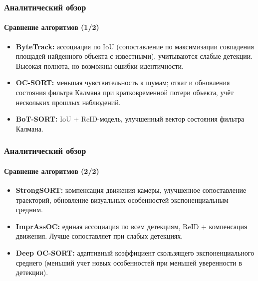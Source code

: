 \documentclass{beamer} %
\begin{document}
\begin{frame}
  \frametitle{Аналитический обзор}
  \framesubtitle{Сравнение алгоритмов (1/2)}
  \begin{itemize}
    \item \textbf{ByteTrack:} ассоциация по IoU (сопоставление по максимизации совпадения площадей найденного объекта с известными), учитываются слабые детекции. Высокая полнота, но возможны ошибки идентичности.
    \item \textbf{OC-SORT:} меньшая чувствительность к шумам; откат и обновления состояния фильтра Калмана при кратковременной потери объекта, учёт нескольких прошлых наблюдений.
    \item \textbf{BoT-SORT:} IoU + ReID-модель, улучшенный вектор состояния фильтра Калмана.
  \end{itemize}
\end{frame}
\begin{frame}
  \frametitle{Аналитический обзор}
  \framesubtitle{Сравнение алгоритмов (2/2)}
  \begin{itemize}
    \item \textbf{StrongSORT:} компенсация движения камеры, улучшенное сопоставление траекторий, обновление визуальных особенностей экспоненциальным средним.
    \item \textbf{ImprAssOC:} единая ассоциация по всем детекциям, ReID + компенсация движения. Лучше сопоставляет при слабых детекциях.
    \item \textbf{Deep OC-SORT:} адаптивный коэффициент скользящего экспоненциального среднего (меньший учет новых особенностей при меньшей уверенности в детекции).
  \end{itemize}
\end{frame}

\end{document}
